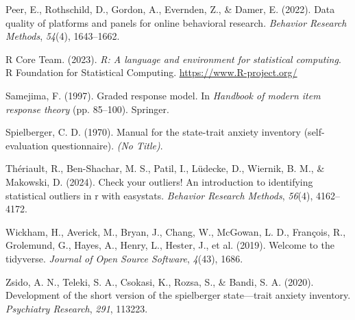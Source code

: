 \documentclass[
  man,
  floatsintext,
  longtable,
  nolmodern,
  notxfonts,
  notimes,
  colorlinks=true,linkcolor=blue,citecolor=blue,urlcolor=blue]{apa7}
\newlength{\cslhangindent}
\newenvironment{CSLReferences}[2] %
 {\begin{list}{}{%
  \setlength{\itemindent}{0pt}
  \setlength{\leftmargin}{0pt}
  \setlength{\parsep}{0pt}
  \ifodd #1
   \setlength{\leftmargin}{\cslhangindent}
   \setlength{\itemindent}{-1\cslhangindent}
  \fi
  \setlength{\itemsep}{#2\baselineskip}}}
 {\end{list}}
\begin{document}
\begin{CSLReferences}{1}{0}
Peer, E., Rothschild, D., Gordon, A., Evernden, Z., \& Damer, E. (2022).
Data quality of platforms and panels for online behavioral research.
\emph{Behavior Research Methods}, \emph{54}(4), 1643--1662.

R Core Team. (2023). \emph{R: A language and environment for statistical
computing}. R Foundation for Statistical Computing.
\url{https://www.R-project.org/}

Samejima, F. (1997). Graded response model. In \emph{Handbook of modern
item response theory} (pp. 85--100). Springer.

Spielberger, C. D. (1970). Manual for the state-trait anxiety inventory
(self-evaluation questionnaire). \emph{(No Title)}.

Thériault, R., Ben-Shachar, M. S., Patil, I., Lüdecke, D., Wiernik, B.
M., \& Makowski, D. (2024). Check your outliers﻿! An introduction to
identifying statistical outliers in r with easystats. \emph{Behavior
Research Methods}, \emph{56}(4), 4162--4172.

Wickham, H., Averick, M., Bryan, J., Chang, W., McGowan, L. D.,
François, R., Grolemund, G., Hayes, A., Henry, L., Hester, J., et al.
(2019). Welcome to the tidyverse. \emph{Journal of Open Source
Software}, \emph{4}(43), 1686.

Zsido, A. N., Teleki, S. A., Csokasi, K., Rozsa, S., \& Bandi, S. A.
(2020). Development of the short version of the spielberger
state---trait anxiety inventory. \emph{Psychiatry Research}, \emph{291},
113223.

\end{CSLReferences}
\end{document}
